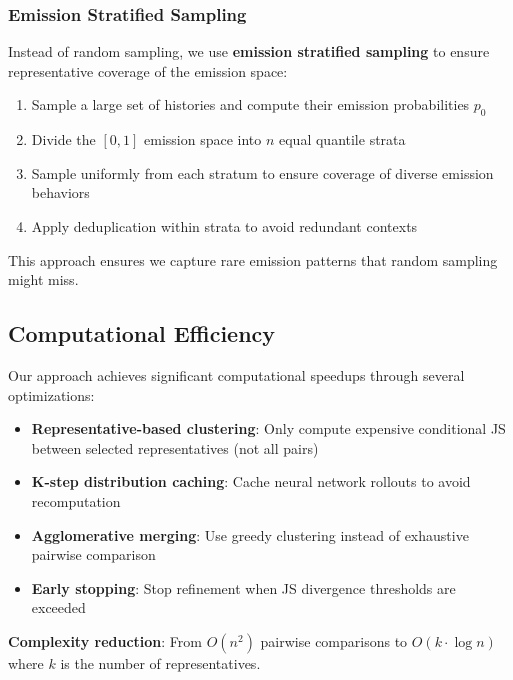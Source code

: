 \documentclass[11pt]{article}
\begin{document}
\subsubsection{Emission Stratified Sampling}

Instead of random sampling, we use \textbf{emission stratified sampling} to ensure representative coverage of the emission space:

\begin{notebox}
\begin{enumerate}
\item Sample a large set of histories and compute their emission probabilities $p_0$
\item Divide the $[0,1]$ emission space into $n$ equal quantile strata
\item Sample uniformly from each stratum to ensure coverage of diverse emission behaviors
\item Apply deduplication within strata to avoid redundant contexts
\end{enumerate}

This approach ensures we capture rare emission patterns that random sampling might miss.
\end{notebox}

\subsection{Computational Efficiency}

Our approach achieves significant computational speedups through several optimizations:

\begin{resultbox}
\begin{itemize}
\item \textbf{Representative-based clustering}: Only compute expensive conditional JS between selected representatives (not all pairs)
\item \textbf{K-step distribution caching}: Cache neural network rollouts to avoid recomputation
\item \textbf{Agglomerative merging}: Use greedy clustering instead of exhaustive pairwise comparison
\item \textbf{Early stopping}: Stop refinement when JS divergence thresholds are exceeded
\end{itemize}

\textbf{Complexity reduction}: From $O(n^2)$ pairwise comparisons to $O(k \cdot \log n)$ where $k$ is the number of representatives.
\end{resultbox}
\end{document}
